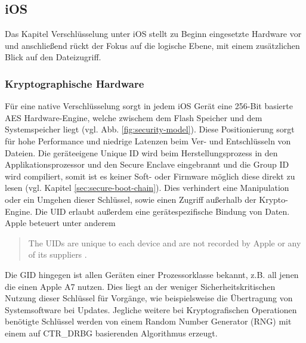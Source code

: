 \subsection{iOS}
	Das Kapitel Verschlüsselung unter iOS stellt zu Beginn eingesetzte Hardware vor
	und anschließend rückt der Fokus auf die logische Ebene, mit einem zusätzlichen
	Blick auf den Dateizugriff.
	\subsubsection{Kryptographische Hardware}\label{sec:crypto-engine}
		Für eine native Verschlüsselung sorgt in jedem iOS Gerät eine 256-Bit
		basierte AES Hardware-Engine, welche zwischem dem Flash	Speicher und dem
		Systemspeicher liegt (vgl. Abb. \ref{fig:security-model}). Diese
		Positionierung sorgt für hohe Performance und niedrige Latenzen beim
		Ver- und Entschlüsseln von Dateien. Die geräteeigene Unique ID wird beim
		Herstellungsprozess in den Applikationsprozessor und den Secure Enclave
		eingebrannt und die Group ID wird compiliert, somit ist es keiner Soft- oder
		Firmware möglich diese direkt zu lesen (vgl. Kapitel
		\ref{sec:secure-boot-chain}). Dies verhindert eine Manipulation oder ein
		Umgehen dieser Schlüssel, sowie einen Zugriff außerhalb der Krypto-Engine.
		Die UID erlaubt außerdem eine gerätespezifische Bindung von Daten. Apple
		beteuert unter anderem
		\begin{quote}
			The UIDs are unique to each device and are not recorded by Apple or any of its
			suppliers \cite[S.9]{iOSSecurityApr2015}.
		\end{quote}
		Die GID hingegen ist allen Geräten einer
		Prozessorklasse bekannt, z.B.
		all jenen die einen Apple A7 nutzen. Dies liegt an der weniger
		Sicherheitskritischen Nutzung dieser Schlüssel für Vorgänge,
		wie beispielsweise die Übertragung von Systemsoftware bei Updates. Jegliche
		weitere bei Kryptografischen Operationen benötigte Schlüssel werden von einem
		Random Number Generator (RNG) mit einem auf	CTR\_DRBG \cite{NISTDRBG2012}
		basierenden Algorithmus erzeugt.
